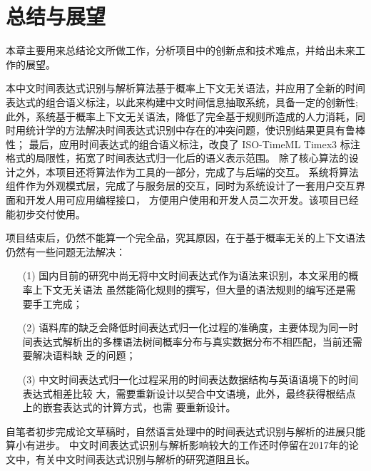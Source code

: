 
\chapter{总结与展望}

本章主要用来总结论文所做工作，分析项目中的创新点和技术难点，并给出未来工作的展望。

本中文时间表达式识别与解析算法基于概率上下文无关语法，并应用了全新的时间表达式的组合语义标注，以此来构建中文时间信息抽取系统，具备一定的创新性;
此外，系统基于概率上下文无关语法，降低了完全基于规则所造成的人力消耗，同时用统计学的方法解决时间表达式识别中存在的冲突问题，使识别结果更具有鲁棒性；
最后，应用时间表达式的组合语义标注，改良了 ISO-TimeML Timex3 标注格式的局限性，拓宽了时间表达式归一化后的语义表示范围。
除了核心算法的设计之外，本项目还将算法作为工具的一部分，完成了与后端的交互。
系统将算法组件作为外观模式层，完成了与服务层的交互，同时为系统设计了一套用户交互界面和开发人用可应用编程接口，
方便用户使用和开发人员二次开发。该项目已经能初步交付使用。

项目结束后，仍然不能算一个完全品，究其原因，在于基于概率无关的上下文语法仍然有一些问题无法解决：
\begin{enumerate}
    \item[(1)] 国内目前的研究中尚无将中文时间表达式作为语法来识别，本文采用的概率上下文无关语法
          虽然能简化规则的撰写，但大量的语法规则的编写还是需要手工完成；
    \item[(2)] 语料库的缺乏会降低时间表达式归一化过程的准确度，主要体现为同一时
          间表达式解析出的多棵语法树间概率分布与真实数据分布不相匹配，当前还需要解决语料缺
          乏的问题；
    \item[(3)] 中文时间表达式归一化过程采用的时间表达数据结构与英语语境下的时间表达式相差比较
          大，需要重新设计以契合中文语境，此外，最终获得根结点上的嵌套表达式的计算方式，也需
          要重新设计。
\end{enumerate}

自笔者初步完成论文草稿时，自然语言处理中的时间表达式识别与解析的进展只能算小有进步。
中文时间表达式识别与解析影响较大的工作还时停留在2017年的论文中，有关中文时间表达式识别与解析的研究道阻且长。